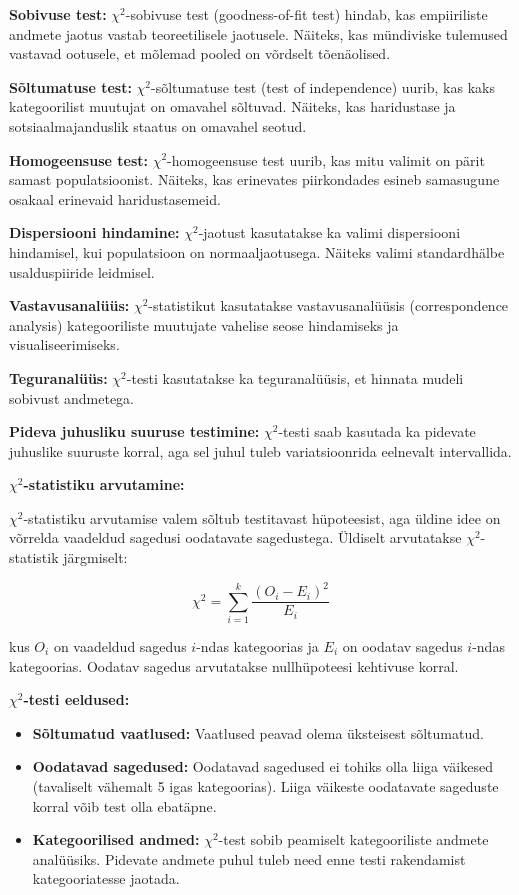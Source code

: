 \documentclass[
]{book}
\providecommand{\tightlist}{%
  \setlength{\itemsep}{0pt}\setlength{\parskip}{0pt}}
\begin{document}
\textbf{Sobivuse test:} \(\chi^2\)-sobivuse test (goodness-of-fit test) hindab, kas empiiriliste andmete jaotus vastab teoreetilisele jaotusele. Näiteks, kas mündiviske tulemused vastavad ootusele, et mõlemad pooled on võrdselt tõenäolised.

\textbf{Sõltumatuse test:} \(\chi^2\)-sõltumatuse test (test of independence) uurib, kas kaks kategoorilist muutujat on omavahel sõltuvad. Näiteks, kas haridustase ja sotsiaalmajanduslik staatus on omavahel seotud.

\textbf{Homogeensuse test:} \(\chi^2\)-homogeensuse test uurib, kas mitu valimit on pärit samast populatsioonist. Näiteks, kas erinevates piirkondades esineb samasugune osakaal erinevaid haridustasemeid.

\textbf{Dispersiooni hindamine:} \(\chi^2\)-jaotust kasutatakse ka valimi dispersiooni hindamisel, kui populatsioon on normaaljaotusega. Näiteks valimi standardhälbe usalduspiiride leidmisel.

\textbf{Vastavusanalüüs:} \(\chi^2\)-statistikut kasutatakse vastavusanalüüsis (correspondence analysis) kategooriliste muutujate vahelise seose hindamiseks ja visualiseerimiseks.

\textbf{Teguranalüüs:} \(\chi^2\)-testi kasutatakse ka teguranalüüsis, et hinnata mudeli sobivust andmetega.

\textbf{Pideva juhusliku suuruse testimine:} \(\chi^2\)-testi saab kasutada ka pidevate juhuslike suuruste korral, aga sel juhul tuleb variatsioonrida eelnevalt intervallida.

\textbf{\(\chi^2\)-statistiku arvutamine:}

\(\chi^2\)-statistiku arvutamise valem sõltub testitavast hüpoteesist, aga üldine idee on võrrelda vaadeldud sagedusi oodatavate sagedustega. Üldiselt arvutatakse \(\chi^2\)-statistik järgmiselt:

\[\chi^2 = \sum_{i=1}^k \frac{(O_i - E_i)^2}{E_i}\]

kus \(O_i\) on vaadeldud sagedus \(i\)-ndas kategoorias ja \(E_i\) on oodatav sagedus \(i\)-ndas kategoorias. Oodatav sagedus arvutatakse nullhüpoteesi kehtivuse korral.

\textbf{\(\chi^2\)-testi eeldused:}

\begin{itemize}
\tightlist
\item
  \textbf{Sõltumatud vaatlused:} Vaatlused peavad olema üksteisest sõltumatud.
\item
  \textbf{Oodatavad sagedused:} Oodatavad sagedused ei tohiks olla liiga väikesed (tavaliselt vähemalt 5 igas kategoorias). Liiga väikeste oodatavate sageduste korral võib test olla ebatäpne.
\item
  \textbf{Kategoorilised andmed:} \(\chi^2\)-test sobib peamiselt kategooriliste andmete analüüsiks. Pidevate andmete puhul tuleb need enne testi rakendamist kategooriatesse jaotada.
\end{itemize}
\end{document}

